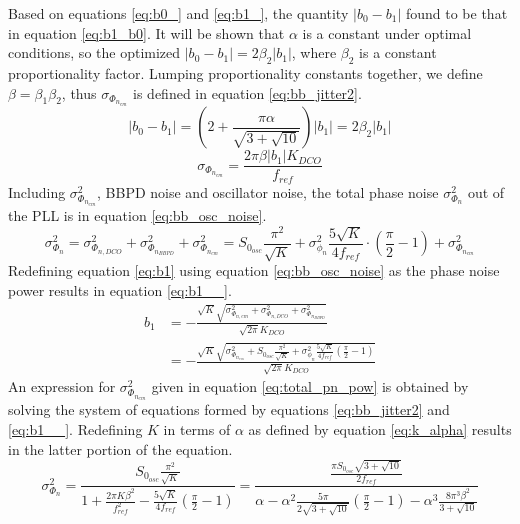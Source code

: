	Based on equations \ref{eq:b0_} and \ref{eq:b1_}, the quantity $|b_0-b_1|$ found to be that in equation \ref{eq:b1_b0}. It will be shown that $\alpha$ is a constant under optimal conditions, so the optimized $|b_0-b_1| = 2\beta_2|b_1|$, where $\beta_2$ is a constant proportionality factor. Lumping proportionality constants together, we define $\beta = \beta_1\beta_2$, thus $\sigma_{\Phi_{n_{em}}}$ is defined in equation \ref{eq:bb_jitter2}.
	\begin{equation}\label{eq:b1_b0}
			|b_0-b_1| = \left(2 + \frac{\pi \alpha}{\sqrt{3+\sqrt{10}}}\right)|b_1| = 2\beta_2|b_1|
	\end{equation}
	\begin{equation}\label{eq:bb_jitter2}
		\sigma_{\Phi_{n_{em}}} = \frac{2\pi \beta |b_1|K_{DCO}}{f_{ref}}
	\end{equation}	
	Including $\sigma^2_{\Phi_{n_{em}}}$, BBPD noise and oscillator noise, the total phase noise $\sigma^2_{\Phi_{n}}$ out of the PLL is in equation \ref{eq:bb_osc_noise}.
	\begin{equation}\label{eq:bb_osc_noise}
		\sigma_{\Phi_{n}}^2 = \sigma_{\Phi_{n,DCO}}^2 + \sigma^2_{\Phi_{n_{BBPD}}} + \sigma^2_{\Phi_{n_{em}}} = S_{0_{osc}}\frac{\pi^2}{\sqrt{K}} + \sigma^2_{\phi_n}\frac{5\sqrt{K}}{4f_{ref}}\cdot\left(\frac{\pi}{2}-1\right)  + \sigma^2_{\Phi_{n_{em}}}
	\end{equation}
	Redefining equation \ref{eq:b1} using equation \ref{eq:bb_osc_noise} as the phase noise power results in equation \ref{eq:b1__}.
		\begin{align}\label{eq:b1__}
			 b_1 &=  - \frac{\sqrt{K}\sqrt{\sigma_{\Phi_{n,em}}^2 + \sigma_{\Phi_{n,DCO}}^2 + \sigma^2_{\Phi_{n_{BBPD}}} }}{\sqrt{2\pi}K_{DCO}} \\
			 & = - \frac{\sqrt{K}\sqrt{ \sigma^2_{\Phi_{n_{em}}} +  S_{0_{osc}}\frac{\pi^2}{\sqrt{K}} + \sigma^2_{\phi_n}\frac{5\sqrt{K}}{4f_{ref}}\left(\frac{\pi}{2}-1\right)}  }{\sqrt{2\pi}K_{DCO}}
		\end{align}
	An expression for $\sigma^2_{\Phi_{n_{em}}}$ given in equation \ref{eq:total_pn_pow} is obtained by solving the system of equations formed by equations \ref{eq:bb_jitter2} and \ref{eq:b1__}. Redefining $K$ in terms of $\alpha$ as defined by equation \ref{eq:k_alpha} results in the latter portion of the equation.
	 	\begin{equation}\label{eq:total_pn_pow}
	 		\sigma^2_{\Phi_{n}} = \frac{S_{0_{osc}}\frac{\pi^2}{\sqrt{K}}}{1 + \frac{2\pi K \beta^2}{f_{ref}^2} - \frac{5\sqrt{K}}{4f_{ref}} \left(\frac{\pi}{2}-1\right)}  
	 		= \frac{\frac{\pi S_{0_{osc}}\sqrt{3+\sqrt{10}}}{2f_{ref}}}{\alpha - \alpha^2\frac{5\pi}{2\sqrt{3+\sqrt{10}}}\left(\frac{\pi}{2}-1\right) - \alpha^3 \frac{8\pi^3\beta^2}{3+\sqrt{10}}}
	 	\end{equation}
